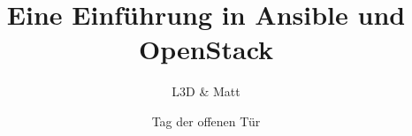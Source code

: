\documentclass[aspectratio=169]{beamer}
\title{Eine Einführung in Ansible und OpenStack}
\author{L3D \& Matt}
\institute[Toolbox Bodensee]
\date{Tag der offenen Tür \the\year}
\begin{document}
\begin{frame}
  \titlepage
\end{frame}
\end{document}
